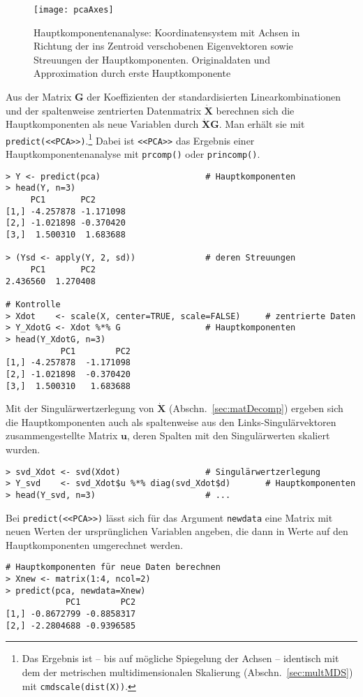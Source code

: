 \begin{figure}[ht]
\centering
\texttt{[image: pcaAxes]}
\vspace*{-1em}
\caption{Hauptkomponentenanalyse: Koordinatensystem mit Achsen in Richtung der ins Zentroid verschobenen Eigenvektoren sowie Streuungen der Hauptkomponenten. Originaldaten und Approximation durch erste Hauptkomponente}
\label{fig:pca}
\end{figure}

Aus der Matrix $\bm{G}$ der Koeffizienten der standardisierten Linearkombinationen und der spaltenweise zentrierten Datenmatrix $\dot{\bm{X}}$ berechnen sich die Hauptkomponenten als neue Variablen durch $\dot{\bm{X}} \bm{G}$. Man erhält sie mit \lstinline!predict(<<PCA>>)!.\footnote{\label{ftn:pcamds}Das Ergebnis ist -- bis auf mögliche Spiegelung der Achsen -- identisch mit dem der metrischen multidimensionalen Skalierung (Abschn.\ \ref{sec:multMDS}) mit \lstinline!cmdscale(dist(X))!.} Dabei ist \lstinline!<<PCA>>! das Ergebnis einer Hauptkomponentenanalyse mit \lstinline!prcomp()! oder \lstinline!princomp()!. 
\begin{lstlisting}
> Y <- predict(pca)                     # Hauptkomponenten
> head(Y, n=3)
     PC1       PC2
[1,] -4.257878 -1.171098
[2,] -1.021898 -0.370420
[3,]  1.500310  1.683688

> (Ysd <- apply(Y, 2, sd))              # deren Streuungen
     PC1       PC2
2.436560  1.270408

# Kontrolle
> Xdot    <- scale(X, center=TRUE, scale=FALSE)     # zentrierte Daten
> Y_XdotG <- Xdot %*% G                 # Hauptkomponenten
> head(Y_XdotG, n=3)
           PC1        PC2
[1,] -4.257878  -1.171098
[2,] -1.021898  -0.370420
[3,]  1.500310   1.683688
\end{lstlisting}

Mit der Singulärwertzerlegung von $\dot{\bm{X}}$ (Abschn.\ \ref{sec:matDecomp}) ergeben sich die Hauptkomponenten auch als spaltenweise aus den Links-Singulärvektoren zusammengestellte Matrix $\bm{u}$, deren Spalten mit den Singulärwerten skaliert wurden.
\begin{lstlisting}
> svd_Xdot <- svd(Xdot)                 # Singulärwertzerlegung
> Y_svd    <- svd_Xdot$u %*% diag(svd_Xdot$d)       # Hauptkomponenten
> head(Y_svd, n=3)                      # ...
\end{lstlisting}

Bei \lstinline!predict(<<PCA>>)! lässt sich für das Argument \lstinline!newdata! eine Matrix mit neuen Werten der ursprünglichen Variablen angeben, die dann in Werte auf den Hauptkomponenten umgerechnet werden.
\begin{lstlisting}
# Hauptkomponenten für neue Daten berechnen
> Xnew <- matrix(1:4, ncol=2)
> predict(pca, newdata=Xnew)
            PC1        PC2
[1,] -0.8672799 -0.8858317
[2,] -2.2804688 -0.9396585
\end{lstlisting}

